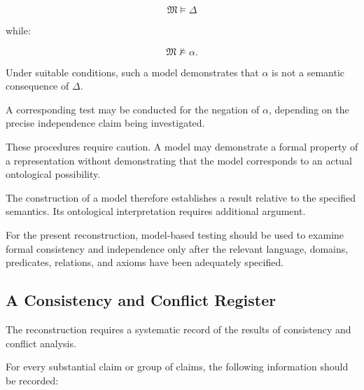 \[
    \mathfrak{M}\models\Delta
\]

while:

\[
    \mathfrak{M}\not\models\alpha.
\]

Under suitable conditions, such a model demonstrates
that \(\alpha\) is not a semantic consequence of
\(\Delta\).

A corresponding test may be conducted for the negation
of \(\alpha\), depending on the precise independence
claim being investigated.

These procedures require caution. A model may demonstrate
a formal property of a representation without demonstrating
that the model corresponds to an actual ontological
possibility.

The construction of a model therefore establishes
a result relative to the specified semantics. Its
ontological interpretation requires additional argument.

For the present reconstruction, model-based testing
should be used to examine formal consistency and
independence only after the relevant language, domains,
predicates, relations, and axioms have been adequately
specified.

\subsection{A Consistency and Conflict Register}

The reconstruction requires a systematic record of
the results of consistency and conflict analysis.

For every substantial claim or group of claims, the
following information should be recorded:

